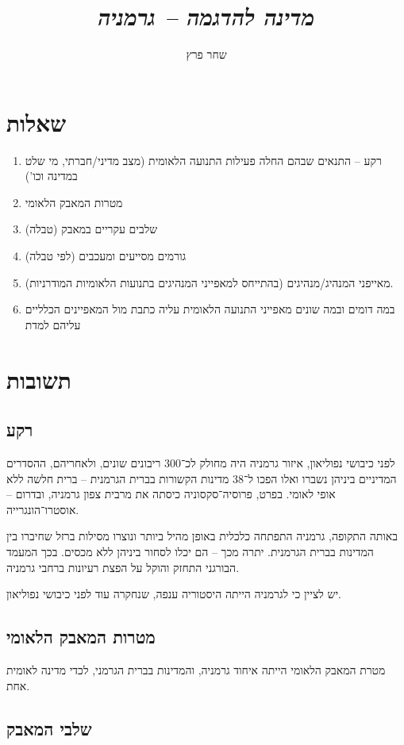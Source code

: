 \documentclass[]{article}
\author{שחר פרץ}
\title{\textit{מדינה להדגמה – גרמניה}}
\begin{document}
	\maketitle
	\section{שאלות}
	
	\begin{enumerate}
		\item רקע – התנאים שבהם החלה פעילות התנועה הלאומית (מצב מדיני/חברתי, מי שלט במדינה וכו')
		\item מטרות המאבק הלאומי
		\item שלבים עקריים במאבק (טבלה)
		\item גורמים מסייעים ומעכבים (לפי טבלה)
		\item מאייפני המנהיג/מנהיגים (בהתייחס למאפייני המנהיגים בתנועות הלאומיות המודרניות). 
		\item במה דומים ובמה שונים מאפייני התנועה הלאומית עליה כתבת מול המאפיינים הכלליים עליהם למדת
	\end{enumerate}
	
	\section{תשובות}
	
	\subsection{רקע}
	לפני כיבושי נפוליאון, איזור גרמניה היה מחולק לכ־300 ריבונים שונים, ולאחריהם, ההסדרים המדיניים ביניהן נשברו ואלו הפכו ל־38 מדינות הקשורות בברית הגרמנית – ברית חלשה ללא אופי לאומי. בפרט, פרוסיה־סקסוניה כיסתה את מרבית צפון גרמניה, ובדרום – אוסטרו־הונגרייה. 
	
	באותה התקופה, גרמניה התפתחה כלכלית באופן מהיל ביותר ונוצרו מסילות ברזל שחיברו בין המדינות בברית הגרמנית. יתרה מכך – הם יכלו לסחור ביניהן ללא מכסים. בכך המעמד הבורגני התחזק והוקל על הפצת רעיונות ברחבי גרמניה. 
	
	יש לציין כי לגרמניה הייתה היסטוריה ענפה, שנחקרה עוד לפני כיבושי נפוליאון. 
	
	\subsection{מטרות המאבק הלאומי}
	מטרת המאבק הלאומי הייתה איחוד גרמניה, והמדינות בברית הגרמני, לכדי מדינה לאומית אחת. 
	\subsection{שלבי המאבק}
\end{document}
